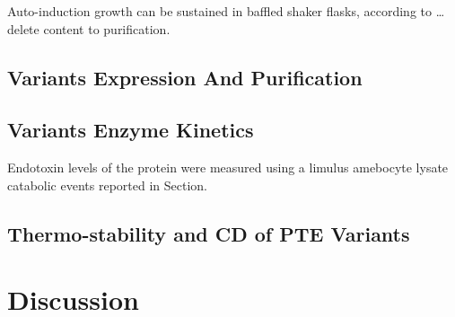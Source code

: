 \begin{refsection}
Auto-induction growth can be sustained in baffled shaker flasks, according to
\ldots delete content to purification.

\subsection{Variants Expression And Purification}

\subsection{Variants Enzyme Kinetics}

Endotoxin levels of the protein were measured using a limulus amebocyte lysate
catabolic events reported in Section.

\subsection{Thermo-stability and CD of PTE Variants}

\section{Discussion}

\printbibliography[heading=subbibliography]

\end{refsection}
